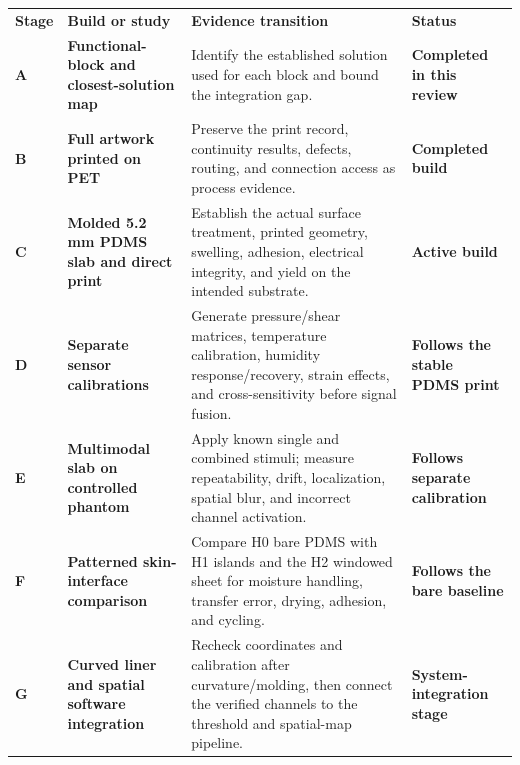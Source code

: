 \vspace{0.65em}
\hypertarget{q2-roadmap}{}

\begingroup
\fontsize{8.3}{9.75}\selectfont
\renewcommand{\arraystretch}{1.09}
\begin{tabularx}{\linewidth}{>{\centering\arraybackslash\bfseries\color{AUBRed}}p{0.8cm}>{\raggedright\arraybackslash\bfseries}p{3.25cm}Y>{\raggedright\arraybackslash}p{2.7cm}}
\color{white}\textbf{Stage} &
\color{white}\textbf{Build or study} &
\color{white}\textbf{Evidence transition} &
\color{white}\textbf{Status} \\
A & Functional-block and closest-solution map & Identify the established
solution used for each block and bound the integration gap. & \textbf{Completed
in this review} \\
B & Full artwork printed on PET & Preserve the print record, continuity results,
defects, routing, and connection access as process evidence. & \textbf{Completed
build} \\
C & Molded 5.2 mm PDMS slab and direct print & Establish the actual surface
treatment, printed geometry, swelling, adhesion, electrical integrity, and
yield on the intended substrate. & \textbf{Active build} \\
D & Separate sensor calibrations & Generate pressure/shear matrices,
temperature calibration, humidity response/recovery, strain effects, and
cross-sensitivity before signal fusion. & \textbf{Follows the stable PDMS print} \\
E & Multimodal slab on controlled phantom & Apply known single and combined
stimuli; measure repeatability, drift, localization, spatial blur, and incorrect
channel activation. & \textbf{Follows separate calibration} \\
F & Patterned skin-interface comparison & Compare H0 bare PDMS with H1 islands
and the H2 windowed sheet for moisture handling, transfer error, drying,
adhesion, and cycling. &
\textbf{Follows the bare baseline} \\
G & Curved liner and spatial software integration & Recheck coordinates and
calibration after curvature/molding, then connect the verified channels to the
threshold and spatial-map pipeline. & \textbf{System-integration stage} \\
\end{tabularx}
\endgroup
{}

